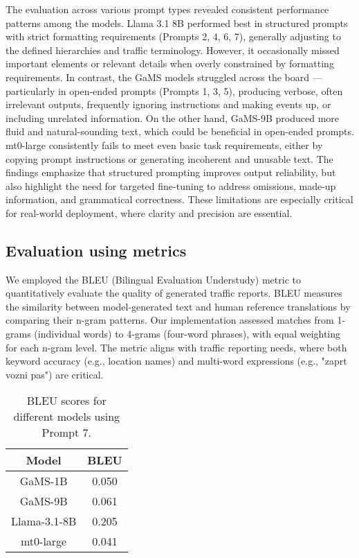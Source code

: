 \documentclass[fleqn,moreauthors,10pt]{ds_report}
\begin{document}
The evaluation across various prompt types revealed consistent performance patterns among the models. Llama 3.1 8B performed best in structured prompts with strict formatting requirements (Prompts 2, 4, 6, 7), generally adjusting to the defined hierarchies and traffic terminology. However, it occasionally missed important elements or relevant details when overly constrained by formatting requirements. In contrast, the GaMS models struggled across the board — particularly in open-ended prompts (Prompts 1, 3, 5), producing verbose, often irrelevant outputs, frequently ignoring instructions and making events up, or including unrelated information. On the other hand, GaMS-9B produced more fluid and natural-sounding text, which could be beneficial in open-ended prompts. mt0-large consistently fails to meet even basic task requirements, either by copying prompt instructions or generating incoherent and unusable text. The findings emphasize that structured prompting improves output reliability, but also highlight the need for targeted fine-tuning to address omissions, made-up information, and grammatical correctness. These limitations are especially critical for real-world deployment, where clarity and precision are essential.

\subsection*{Evaluation using metrics}

We employed the BLEU (Bilingual Evaluation Understudy) metric to quantitatively evaluate the quality of generated traffic reports. BLEU measures the similarity between model-generated text and human reference translations by comparing their n-gram patterns. Our implementation assessed matches from 1-grams (individual words) to 4-grams (four-word phrases), with equal weighting for each n-gram level. The metric aligns with traffic reporting needs, where both keyword accuracy (e.g., location names) and multi-word expressions (e.g., "zaprt vozni pas") are critical.

\begin{table}[h!]
\centering
\setlength{\tabcolsep}{6pt}
\renewcommand{\arraystretch}{1}
\caption{BLEU scores for different models using Prompt 7.}
\begin{tabular}{cc}
\toprule
Model & BLEU \\
\midrule
GaMS-1B & 0.050 \\
GaMS-9B & 0.061 \\
Llama-3.1-8B & 0.205\\
mt0-large & 0.041 \\
\bottomrule
\end{tabular}
\label{tab:table2}
\end{table}
\end{document}

